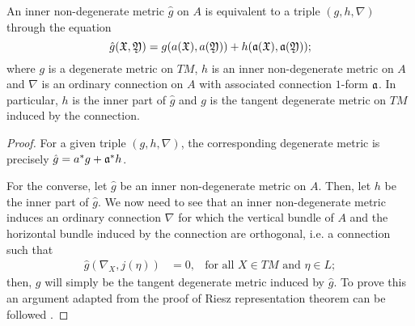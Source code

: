 \begin{theorem}\label{theoremEquivalenceMetricOnAlgebroidToTriple}
An inner non-degenerate metric $\hat g$ on $A$ is equivalent to a triple $(g, h, \nabla)$ through the equation
\begin{equation}\label{equationRelationMetricAWithTriple}
    \hat g(\mathfrak{X}, \mathfrak{Y}) = g(a(\mathfrak{X}), a(\mathfrak{Y})) + h(\mathfrak{a}(\mathfrak{X}), \mathfrak{a}(\mathfrak{Y}));
\end{equation}
where $g$ is a degenerate metric on $TM$, $h$ is an inner non-degenerate metric on $A$ and $\nabla$ is an ordinary connection on $A$ with associated connection $1$-form $\mathfrak{a}$. In particular, $h$ is the inner part of $\hat g$ and $g$ is the tangent degenerate metric on $TM$ induced by the connection.
\end{theorem}
\begin{proof}
For a given triple $(g, h, \nabla)$, the corresponding degenerate metric is precisely $\hat g = a^*g + \mathfrak{a}^* h$.

For the converse, let $\hat g$ be an inner non-degenerate metric on $A$. Then, let $h$ be the inner part of $\hat g$. We now need to see that an inner non-degenerate metric induces an ordinary connection $\nabla$ for which the vertical bundle of $A$ and the horizontal bundle induced by the connection are orthogonal, i.e. a connection such that
\begin{align}
    \hat g(\nabla_X, j(\eta)) &= 0,& \text{for all $X \in TM$ and $\eta \in L$};
\end{align} then, $g$ will simply be the tangent degenerate metric induced by $\hat g$. To prove this an argument adapted from the proof of Riesz representation theorem can be followed \cite{Fournel2013}.
\end{proof}


